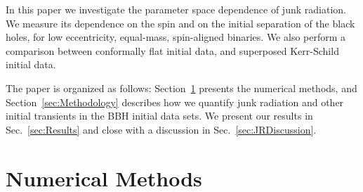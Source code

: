 In this paper we investigate the parameter space dependence of junk
radiation. We measure its dependence on the spin and on the initial
separation of the black holes, for low eccentricity, equal-mass,
spin-aligned binaries. We also perform a comparison between conformally
flat initial data, and superposed Kerr-Schild initial data.

The paper is organized as follows: 
  Section~\ref{sec:NumericalMethods} presents the numerical methods,
  and Section~\ref{sec:Methodology} describes how we quantify junk
  radiation and other initial transients in the BBH initial data sets.
  We present our results in Sec.~\ref{sec:Results} and close with a discussion in Sec.~\ref{sec:JRDiscussion}.

\section{Numerical Methods}
\label{sec:NumericalMethods}

